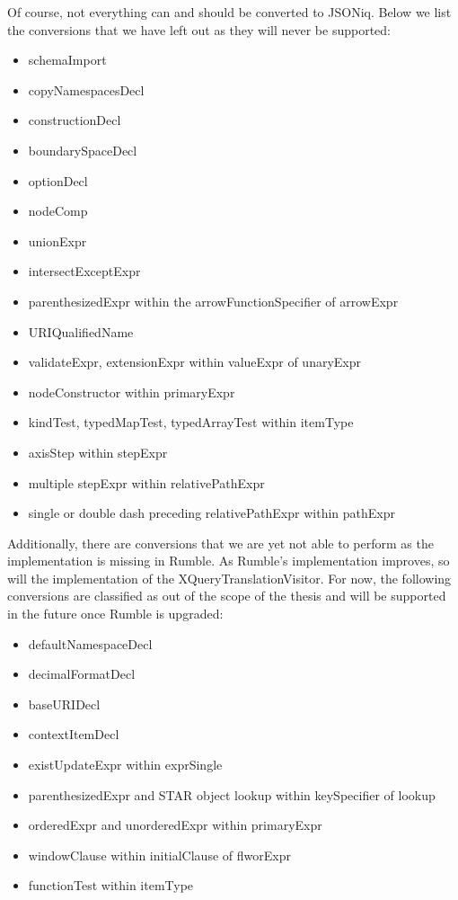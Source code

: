 Of course, not everything can and should be converted to JSONiq. Below we list the conversions that we have left out as they will never be supported:
\begin{itemize}
	\item schemaImport
	\item copyNamespacesDecl
	\item constructionDecl
	\item boundarySpaceDecl
	\item optionDecl
	\item nodeComp
	\item unionExpr
	\item intersectExceptExpr
	\item parenthesizedExpr within the arrowFunctionSpecifier of arrowExpr
	\item URIQualifiedName
	\item validateExpr, extensionExpr within valueExpr of unaryExpr
	\item nodeConstructor within primaryExpr
	\item kindTest, typedMapTest, typedArrayTest within itemType
	\item axisStep within stepExpr
	\item multiple stepExpr within relativePathExpr
	\item single or double dash preceding relativePathExpr within pathExpr
\end{itemize}

Additionally, there are conversions that we are yet not able to perform as the implementation is missing in Rumble. As Rumble's implementation improves, so will the implementation of the XQueryTranslationVisitor. For now, the following conversions are classified as out of the scope of the thesis and will be supported in the future once Rumble is upgraded:
\begin{itemize}
	\item defaultNamespaceDecl
	\item decimalFormatDecl
	\item baseURIDecl
	\item contextItemDecl
	\item existUpdateExpr within exprSingle
	\item parenthesizedExpr and STAR object lookup within keySpecifier of lookup
	\item orderedExpr and unorderedExpr within primaryExpr
	\item windowClause within initialClause of flworExpr
	\item functionTest within itemType
\end{itemize}

